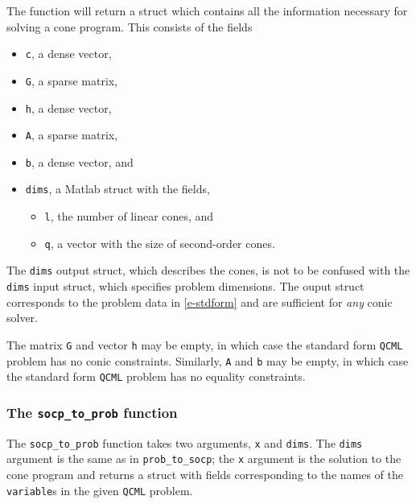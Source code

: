 \documentclass[11pt]{article}
\def\qcml{\texttt{QCML}\xspace}
\begin{document}
The function will return a struct which contains all the information
necessary for solving a cone program. This consists of the fields
\begin{itemize}
  \item {\tt c}, a dense vector,
  \item {\tt G}, a sparse matrix,
  \item {\tt h}, a dense vector,
  \item {\tt A}, a sparse matrix,
  \item {\tt b}, a dense vector, and
  \item {\tt dims}, a Matlab struct with the fields,
  \begin{itemize}
    \item {\tt l}, the number of linear cones, and
    \item {\tt q}, a vector with the size of second-order cones.
  \end{itemize}
\end{itemize}
The {\tt dims} output struct, which describes the cones, 
is not to be confused with the {\tt dims} input 
struct, which specifies problem dimensions. 
The ouput struct corresponds to the problem data in \eqref{e-stdform}
and are sufficient for \emph{any} conic solver.

The matrix {\tt G} and vector {\tt h} may be empty, in which case the
standard form \qcml problem has no conic constraints. Similarly, {\tt A} and
{\tt b} may be empty, in which case the standard form \qcml problem has no
equality constraints.

\subsubsection{The {\tt socp\_to\_prob} function}
The {\tt socp\_to\_prob} function takes two arguments, {\tt x} and {\tt dims}.
The {\tt dims} argument is the same as in {\tt prob\_to\_socp}; the {\tt x}
argument is
the solution to the cone program and returns a struct with fields
corresponding to the names of the {\tt variable}s in the given \qcml problem.
\end{document}
